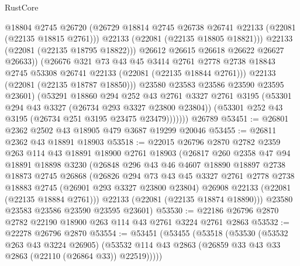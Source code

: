 \begin{lexlean}{RustCore}
\begin{coremodule}
                        @18804
                        @2745
                        @26720
                        (@26729 @18814 @2745 @26738 @26741 @22133 (@22081 (@22135 @18815 @2761)))
                        @22133
                        (@22081 (@22135 @18805 @18821)))
                      @22133
                      (@22081 (@22135 @18795 @18822)))
                    @26612
                    @26615
                    @26618
                    @26622
                    @26627
                    @26633))
                (@26676
                  @321
                  @73
                  @43
                  @45
                  @3414
                  @2761
                  @2778
                  @2738
                  @18843
                  @2745
                  @53308
                  @26741
                  @22133
                  (@22081 (@22135 @18844 @2761)))
                @22133
                (@22081 (@22135 @18787 @18850)))
              @23580
              @23583
              @23586
              @23590
              @23595
              @23601)
            (@53291
              @18860
              @294
              @252
              @43
              @2761
              @3327
              @2761
              @3195
              (@53301 @294 @43 @3327 (@26734 @293 @3327 @23800 @23804))
              (@53301 @252 @43 @3195 (@26734 @251 @3195 @23475 @23479)))))))
    @26789
@53451 := @26801 @2362 @2502 @43 @18905 @479 @3687 @19299 @20046
@53455 := @26811 @2362 @43 @18891 @18903
@53518 := @22015
    @26796
    @2870
    @2782
    @2359
    @263
    @114
    @43
    @18891
    @18900
    @2761
    @18903
    (@26817
      @260
      @2358
      @47
      @94
      @18891
      @18898
      @3230
      (@26848
        @296
        @43
        @46
        @4607
        @18890
        @18897
        @2738
        @18873
        @2745
        @26868
        (@26826
          @294
          @73
          @43
          @45
          @3327
          @2761
          @2778
          @2738
          @18883
          @2745
          (@26901 @293 @3327 @23800 @23804)
          @26908
          @22133
          (@22081 (@22135 @18884 @2761)))
        @22133
        (@22081 (@22135 @18874 @18890)))
      @23580
      @23583
      @23586
      @23590
      @23595
      @23601)
@53530 := @22186 @26796 @2870 @2782 @22190 @18900 @263 @114 @43 @2761 @3224 @2761 @2863
@53532 := @22278 @26796 @2870
@53554 := @53451
    (@53455
      (@53518
        (@53530
          (@53532 @263 @43 @3224 @26905)
          (@53532 @114 @43 @2863 (@26859 @33 @43 @33 @2863 (@22110 (@26864 @33)) @22519)))))

\end{coremodule}
\end{lexlean}
